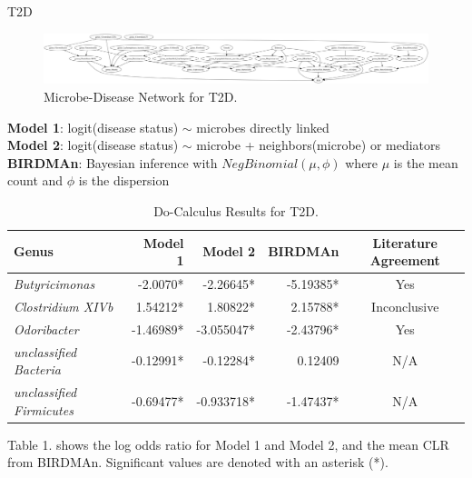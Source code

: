 \documentclass[final]{beamer}
\newlength{\colwidth}
\begin{document}
\begin{frame}[t]
\begin{columns}[t]
\begin{column}{\colwidth}
\begin{block}{T2D}
    \begin{figure}
      \centering
      \includegraphics[width=\linewidth]{../graphs/t2d/cdnod_norm.png}
      \caption{Microbe-Disease Network for T2D.}
    \end{figure}
    
    \vspace{0.5cm}
    
    \textbf{Model 1}: logit(disease status) $\sim$ microbes directly linked \\
    \textbf{Model 2}: logit(disease status) $\sim$ microbe + neighbors(microbe) or mediators \\
    \textbf{BIRDMAn}: Bayesian inference with $NegBinomial(\mu, \phi)$ where $\mu$ is the mean count and $\phi$ is the dispersion
    
    \begin{table}
      \centering
      \begin{tabular}{l r r r c}
        \toprule
        \textbf{Genus} & \textbf{Model 1} & \textbf{Model 2} & \textbf{BIRDMAn} & \textbf{Literature Agreement} \\
        \midrule
        \textit{Butyricimonas} & -2.0070* & -2.26645* & -5.19385* & Yes \\
        \textit{Clostridium XIVb} & 1.54212* & 1.80822* & 2.15788* & Inconclusive \\
        \textit{Odoribacter} & -1.46989* & -3.055047* & -2.43796* & Yes \\
        \textit{unclassified Bacteria} & -0.12991* & -0.12284* & 0.12409 & N/A \\
        \textit{unclassified Firmicutes} & -0.69477* & -0.933718* & -1.47437* & N/A \\
        \bottomrule
      \end{tabular}
      \caption{Do-Calculus Results for T2D.}
    \end{table}
    
    Table 1. shows the log odds ratio for Model 1 and Model 2, and the mean CLR from BIRDMAn. Significant values are denoted with an asterisk (*). \\
    
    

\end{block}
\end{column}
\end{columns}
\end{frame}
\end{document}
